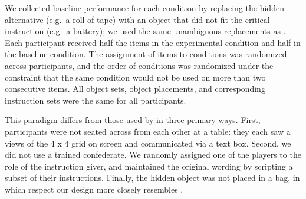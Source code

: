 \documentclass[10pt,letterpaper]{article}
\begin{document}
We collected baseline performance for each condition by replacing the hidden alternative (e.g.~a roll of tape) with an object that did not fit the critical instruction (e.g.~a battery); we used the same unambiguous replacements as . Each participant received half the items in the experimental condition and half in the baseline condition. The assignment of items to conditions was randomized across participants, and the order of conditions was randomized under the constraint that the same condition would not be used on more than two consecutive items. All object sets, object placements, and corresponding instruction sets were the same for all participants.

This paradigm differs from those used by  in three primary ways. First, participants were not seated across from each other at a table: they each saw a views of the 4 x 4 grid on screen and communicated via a text box. Second, we did not use a trained confederate. We randomly assigned one of the players to the role of the instruction giver, and maintained the original wording by scripting a subset of their instructions. Finally, the hidden object was not placed in a bag, in which respect our design more closely resembles .
\end{document}

